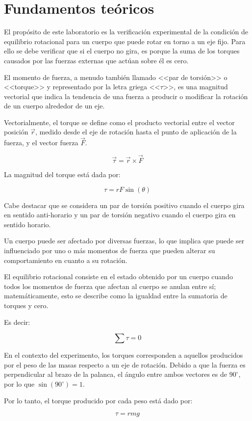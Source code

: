 \chapter{Fundamentos teóricos}

El propósito de este laboratorio es la verificación experimental de la condición de equilibrio rotacional para un cuerpo que puede rotar en torno a un eje fijo. Para ello se debe verificar que si el cuerpo no gira, es porque la suma de los torques causados por las fuerzas externas que actúan sobre él es cero.

El momento de fuerza, a menudo también llamado <<par de torsión>> o <<torque>> y representado por la letra griega <<$\tau$>>, es una magnitud vectorial que indica la tendencia de una fuerza a producir o modificar la rotación de un cuerpo alrededor de un eje.

Vectorialmente, el torque se define como el producto vectorial entre el vector posición $\vec{r}$, medido desde el eje de rotación hasta el punto de aplicación de la fuerza, y el vector fuerza $\vec{F}$.

\begin{equation}
\vec{\tau}=\vec{r}\times\vec{F}
\end{equation}

La magnitud del torque está dada por:

\begin{equation}
    {\tau} = rF\sin{(\theta)}
\end{equation}

Cabe destacar que se considera un par de torsión positivo cuando el cuerpo gira en sentido anti-horario y un par de torsión negativo cuando el cuerpo gira en sentido horario.

Un cuerpo puede ser afectado por diversas fuerzas, lo que implica que puede ser influenciado por uno o más momentos de fuerza que pueden alterar su comportamiento en cuanto a su rotación.

El equilibrio rotacional consiste en el estado obtenido por un cuerpo cuando todos los momentos de fuerza que afectan al cuerpo se anulan entre sí; matemáticamente, esto se describe como la igualdad entre la sumatoria de torques y cero.

Es decir:

\begin{equation}
    \sum \tau = 0
\end{equation}

\newpage

En el contexto del experimento, los torques corresponden a aquellos producidos por el peso de las masas respecto a un eje de rotación. Debido a que la fuerza es perpendicular al brazo de la palanca, el ángulo entre ambos vectores es de $90^\circ$, por lo que $\sin(90^\circ)=1$.

Por lo tanto, el torque producido por cada peso está dado por:

\begin{equation}
    \tau = rmg
\end{equation}